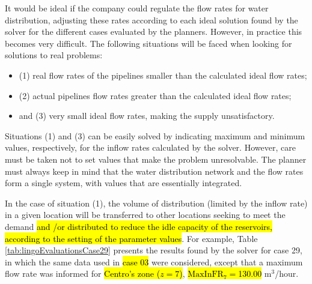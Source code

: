 \documentclass{singlecol}
\theoremstyle{TH}{
\newtheorem{lemma}{Lemma}
\newtheorem{theorem}[lemma]{Theorem}
\newtheorem{corrolary}[lemma]{Corrolary}
\newtheorem{conjecture}[lemma]{Conjecture}
\newtheorem{proposition}[lemma]{Proposition}
\newtheorem{claim}[lemma]{Claim}
\newtheorem{stheorem}[lemma]{Wrong Theorem}
\newtheorem{algorithm}{Algorithm}
}
\theoremstyle{THrm}{
\newtheorem{definition}{Definition}[section]
\newtheorem{question}{Question}[section]
\newtheorem{remark}{Remark}
\newtheorem{scheme}{Scheme}
}
\theoremstyle{THhit}{
\newtheorem{case}{Case}[section]
}
\begin{document}
It would be ideal if the company could regulate the flow rates for water distribution, adjusting these rates according to each ideal solution found by the solver for the different cases evaluated by the planners. However, in practice this becomes very difficult. The following situations will be faced when looking for solutions to real problems:

\begin{itemize}
\item (1) real flow rates of the pipelines smaller than the calculated ideal flow rates;
\item (2) actual pipelines flow rates greater than the calculated ideal flow rates;
\item and (3) very small ideal flow rates, making the supply unsatisfactory.
\end{itemize}

Situations (1) and (3) can be easily solved by indicating maximum and minimum values, respectively, for the inflow rates calculated by the solver. However, care must be taken not to set values that make the problem unresolvable. The planner must always keep in mind that the water distribution network and the flow rates form a single system, with values that are essentially integrated.

In the case of situation (1), the volume of distribution (limited by the inflow rate) in a given location will be transferred to other locations seeking to meet the demand \hl{and \slash or distributed to reduce the idle capacity of the reservoirs, according to the setting of the parameter values}. For example, Table \ref{tab:lingoEvaluationsCase29} presents the results found by the solver for case 29, in which the same data used in \hl{case 03} were considered, except that a maximum flow rate was informed for \hl{Centro's zone ($z = 7$)}, \hl{$\mathrm{MaxInFR}_7 = $130.00} $\mathrm{m^3}$/hour.
\end{document}
